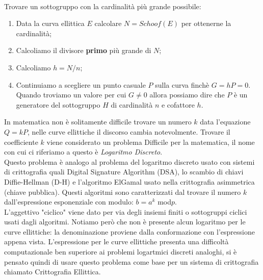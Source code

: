 \documentclass[a4paper,12pt]{tesiinfo}
\begin{document}
\\
Trovare un sottogruppo con la cardinalit\`a pi\`u grande possibile:
\begin{enumerate}
    \item Data la curva ellittica $E$ calcolare $N = Schoof(E)$ per ottenerne la cardinalit\`a;
    \item Calcoliamo il divisore \textbf{primo} pi\`u grande di $N$;
    \item Calcoliamo $h = N \big / n$;
    \item Continuiamo a scegliere un punto casuale $P$ sulla curva finch\`e $G = hP = 0$. Quando troviamo un valore per cui $G \ne 0$ allora possiamo dire che $P$ \`e un generatore del sottogruppo $H$ di cardinalit\`a $n$ e cofattore $h$.
\end{enumerate}
In matematica non \`e solitamente difficile trovare un numero $k$ data l'equazione $Q = kP$, nelle curve ellittiche il discorso cambia notevolmente. Trovare il coefficiente $k$ viene considerato un problema Difficile per la matematica, il nome con cui ci riferiamo a questo \`e \textit{Logaritmo Discreto}.
\\
Questo problema \`e analogo al problema del logaritmo discreto usato con sistemi di crittografia quali Digital Signature Algorithm (DSA), lo scambio di chiavi Diffie-Hellman (D-H) e l'algoritmo ElGamal usato nella crittografia asimmetrica (chiave pubblica). Questi algoritmi sono caratterizzati dal trovare il numero $k$ dall'espressione esponenziale con modulo: $b = a^k$ mod$p$. 
\\
L'aggettivo "ciclico" viene dato per via degli insiemi finiti o sottogruppi ciclici usati dagli algoritmi. Notiamo per\`o che non \`e presente alcun logaritmo per le curve ellittiche: la denominazione proviene dalla conformazione con l'espressione appena vista. L'espressione per le curve ellittiche presenta una difficolt\`a computazionale ben superiore ai problemi logartmici discreti analoghi, si \`e pensato quindi di usare questo problema come base per un sistema di crittografia chiamato Crittografia Ellittica.
%
%
%
%
%
\end{document}
